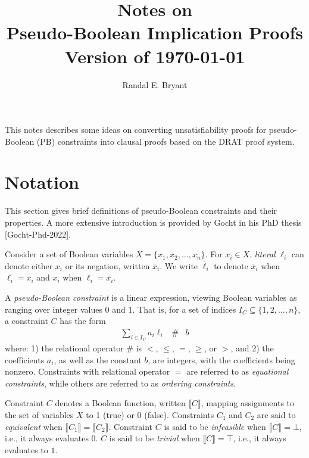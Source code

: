 \documentclass{easychair}
\title{Notes on \\ Pseudo-Boolean Implication Proofs \\ Version of \today}
\author{Randal E. Bryant}
\institute{
Computer Science Department \\
Carnegie Mellon University, Pittsburgh, PA, United States\\
\email{Randy.Bryant@cs.cmu.edu}
}
\renewcommand{\obar}[1]{\overline{#1}}
\newcommand{\lit}{\ell}
\newcommand{\indices}{I}
\newcommand{\func}[1]{\llbracket#1\rrbracket}
\begin{document}
\maketitle

This notes describes some ideas on converting unsatisfiability proofs
for pseudo-Boolean (PB) constraints into clausal proofs based on the
DRAT proof system.

\section{Notation}

This section gives brief definitions of pseudo-Boolean constraints and their properties.
A more extensive introduction is provided by Gocht in his PhD thesis [Gocht-Phd-2022].

Consider a set of Boolean variables $X = \{ x_1, x_2, \ldots, x_n \}$.  For $x_i \in X$, {\em literal}
$\lit_i$ can denote either $x_i$ or its negation, written $\obar{x}_i$.  We
write $\obar{\lit}_i$ to denote $\obar{x}_i$ when $\lit_i = x_i$ and $x_i$ when
$\lit_i = \obar{x}_i$.

A {\em pseudo-Boolean constraint} is a linear expression, viewing
Boolean variables as ranging over integer values $0$ and $1$.  That
is, for a set of indices $\indices_C \subseteq \{ 1, 2, \ldots, n \}$,
a constraint $C$ has the form
\begin{eqnarray}
\sum_{i \in \indices_C } a_i \lit_i & \# & b \label{eqn:pbconstraint}
\end{eqnarray}
where: 1) the relational operator $\#$ is $<$, $\leq$, $=$, $\geq$, or
$>$, and 2) the coefficients $a_i$, as well as the constant $b$, are
integers, with the coefficients being nonzero.
Constraints with relational operator $=$ are referred to as {\em equational constraints},
while others are referred to as {\em ordering constraints}.

Constraint $C$ denotes a Boolean function, written
$\func{C}$, mapping assignments to the set of variables $X$ to 1
(true) or 0 (false).  Constraints $C_1$ and $C_2$ are said to {\em
  equivalent} when $\func{C_1} = \func{C_2}$.
Constraint $C$ is said to be {\em infeasible} when $\func{C} = \bot$, i.e., it always evaluates $0$.
$C$ is said to be {\em trivial} when $\func{C} = \top$, i.e., it always evaluates to $1$.
\end{document}
